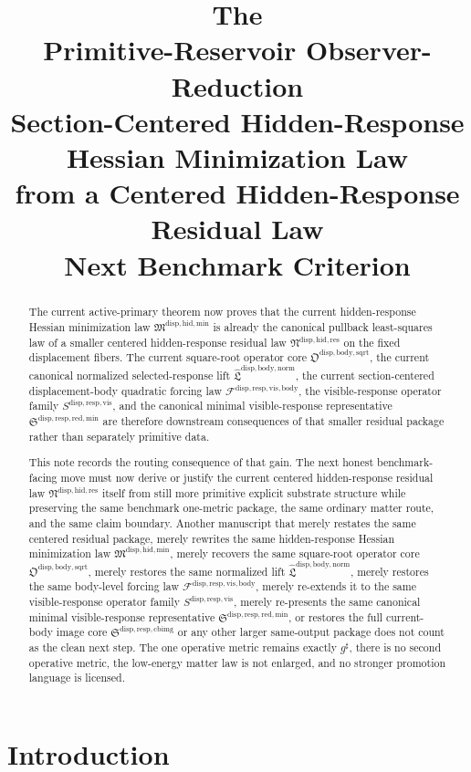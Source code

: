 \documentclass[11pt]{article}
\title{\textbf{The \TheoryName{}}\\[0.4em]
\large Primitive-Reservoir Observer-Reduction\\
\large Section-Centered Hidden-Response\\
\large Hessian Minimization Law\\
\large from a Centered Hidden-Response\\
\large Residual Law\\
\large Next Benchmark Criterion}
\author{}
\date{}
\newcommand{\CompletedMetric}{g^{\sharp}}
\newcommand{\ResidualLawPackage}{\mathfrak N^{\mathrm{disp,hid,res}}}
\newcommand{\HiddenMinimizationPackage}{\mathfrak M^{\mathrm{disp,hid,min}}}
\newcommand{\SquareRootOperatorCore}{\mathfrak O^{\mathrm{disp,body,sqrt}}}
\newcommand{\NormalizedLiftPackage}{\widehat{\mathfrak L}^{\mathrm{disp,body,norm}}}
\newcommand{\VisibleBodyForcingLaw}{\mathscr F^{\mathrm{disp,resp,vis,body}}}
\newcommand{\VisibleResponseOperator}{S^{\mathrm{disp,resp,vis}}}
\newcommand{\MinimalReducedStructure}{\mathfrak S^{\mathrm{disp,resp,red,min}}}
\newcommand{\CurrentBodyImageCore}{\mathfrak S^{\mathrm{disp,resp,cbimg}}}
\begin{document}
\maketitle

\begin{abstract}
The current active-primary theorem now proves that the current hidden-response Hessian minimization law \(\HiddenMinimizationPackage\) is already the canonical pullback least-squares law of a smaller centered hidden-response residual law \(\ResidualLawPackage\) on the fixed displacement fibers. The current square-root operator core \(\SquareRootOperatorCore\), the current canonical normalized selected-response lift \(\NormalizedLiftPackage\), the current section-centered displacement-body quadratic forcing law \(\VisibleBodyForcingLaw\), the visible-response operator family \(\VisibleResponseOperator\), and the canonical minimal visible-response representative \(\MinimalReducedStructure\) are therefore downstream consequences of that smaller residual package rather than separately primitive data.

This note records the routing consequence of that gain. The next honest benchmark-facing move must now derive or justify the current centered hidden-response residual law \(\ResidualLawPackage\) itself from still more primitive explicit substrate structure while preserving the same benchmark one-metric package, the same ordinary matter route, and the same claim boundary. Another manuscript that merely restates the same centered residual package, merely rewrites the same hidden-response Hessian minimization law \(\HiddenMinimizationPackage\), merely recovers the same square-root operator core \(\SquareRootOperatorCore\), merely restores the same normalized lift \(\NormalizedLiftPackage\), merely restores the same body-level forcing law \(\VisibleBodyForcingLaw\), merely re-extends it to the same visible-response operator family \(\VisibleResponseOperator\), merely re-presents the same canonical minimal visible-response representative \(\MinimalReducedStructure\), or restores the full current-body image core \(\CurrentBodyImageCore\) or any other larger same-output package does not count as the clean next step. The one operative metric remains exactly \(\CompletedMetric\), there is no second operative metric, the low-energy matter law is not enlarged, and no stronger promotion language is licensed.
\end{abstract}

\section{Introduction}
\end{document}
